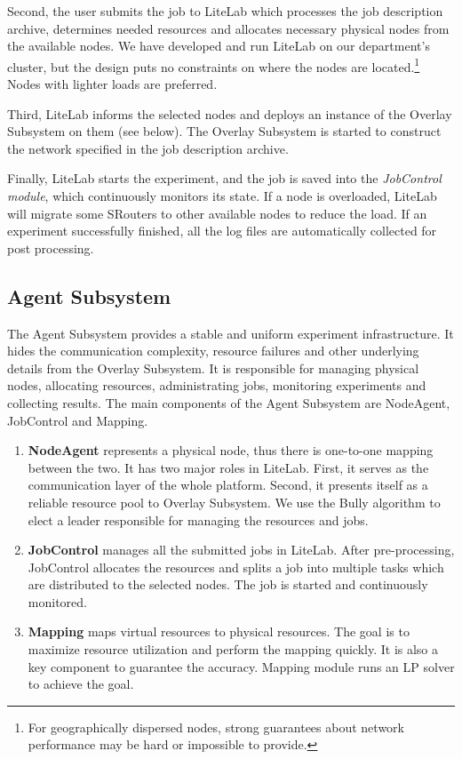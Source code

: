 \documentclass[conference]{IEEEtran}
\begin{document}
Second, the user submits the job to LiteLab which processes the job
description archive, determines needed resources and allocates
necessary physical nodes from the available nodes. We have developed
and run LiteLab on our department's cluster, but the design puts no
constraints on where the nodes are located.\footnote{For
  geographically dispersed nodes, strong guarantees about network
  performance may be hard or impossible to provide.} Nodes with
lighter loads are preferred.

Third, LiteLab informs the selected nodes and deploys an instance of
the Overlay Subsystem on them (see below). The Overlay Subsystem is
started to construct the network specified in the job description
archive.


Finally, LiteLab starts the experiment, and the job is saved into the
\emph{JobControl module}, which continuously monitors its state. If a
node is overloaded, LiteLab will migrate some SRouters to other
available nodes to reduce the load. If an experiment successfully
finished, all the log files are automatically collected for post
processing.




\subsection{Agent Subsystem}
\label{sec:architecture:agent}

The Agent Subsystem provides a stable and uniform experiment
infrastructure. It hides the communication complexity, resource
failures and other underlying details from the Overlay Subsystem.  It
is responsible for managing physical nodes, allocating resources,
administrating jobs, monitoring experiments and collecting
results. The main components of the Agent Subsystem are NodeAgent,
JobControl and Mapping.


\begin{enumerate}

\item \textbf{NodeAgent} represents a physical node, thus there is
  one-to-one mapping between the two. It has two major roles in
  LiteLab. First, it serves as the communication layer of the whole
  platform. Second, it presents itself as a reliable resource pool to
  Overlay Subsystem. We use the Bully algorithm to elect a leader
  responsible for managing the resources and jobs.





\item \textbf{JobControl} manages all the submitted jobs in LiteLab.
  After pre-processing, JobControl allocates the resources and splits
  a job into multiple tasks which are distributed to the selected
  nodes. The job is started and continuously monitored.

\item \textbf{Mapping} maps virtual resources to physical
  resources. The goal is to maximize resource utilization and perform
  the mapping quickly. It is also a key component to guarantee the
  accuracy. Mapping module runs an LP solver to achieve the goal.

\end{enumerate}
\end{document}
